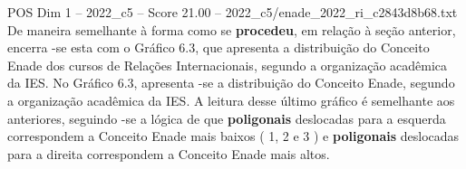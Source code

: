 \begin{textsample}{POS Dim 1 – 2022\_c5 – Score 21.00 – 2022\_c5/enade\_2022\_ri\_c2843d8b68.txt}
De maneira semelhante à forma como se \textbf{procedeu}, em relação à seção anterior, encerra -se esta com o Gráfico 6.3, que apresenta a distribuição do Conceito Enade dos cursos de Relações Internacionais, segundo a organização acadêmica da IES.
No Gráfico 6.3, apresenta -se a distribuição do Conceito Enade, segundo a organização acadêmica da IES.
A leitura desse último gráfico é semelhante aos anteriores, seguindo -se a lógica de que \textbf{poligonais} deslocadas para a esquerda correspondem a Conceito Enade mais baixos ( 1, 2 e 3 ) e \textbf{poligonais} deslocadas para a direita correspondem a Conceito Enade mais altos.

\end{textsample}
